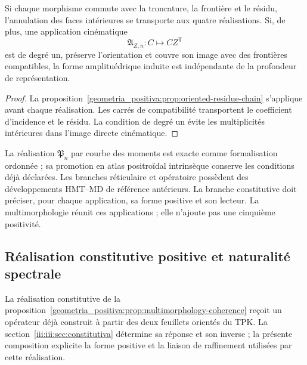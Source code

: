 \begin{proposition}
\label{geometria_positiva:prop:multimorphology-coherence} Si chaque morphisme commute avec la troncature, la frontière et le résidu, l’annulation des faces intérieures se transporte aux quatre réalisations. Si, de plus, une application cinématique
\[
\mathfrak A_{Z,n}:C\longmapsto CZ^{\mathsf T}
\]
est de degré un, préserve l’orientation et couvre son image avec des frontières compatibles, la forme amplituédrique induite est indépendante de la profondeur de représentation.
\end{proposition}
\begin{proof}
La proposition~\ref{geometria_positiva:prop:oriented-residue-chain} s’applique avant chaque réalisation. Les carrés de compatibilité transportent le coefficient d’incidence et le résidu. La condition de degré un évite les multiplicités intérieures dans l’image directe cinématique.
\end{proof}

La réalisation \(\mathfrak P_n\) par courbe des moments est exacte comme formalisation ordonnée ; sa promotion en atlas positroïdal intrinsèque conserve les conditions déjà déclarées. Les branches réticulaire et opératoire possèdent des développements HMT--MD de référence antérieurs. La branche constitutive doit préciser, pour chaque application, sa forme positive et son lecteur. La multimorphologie réunit ces applications ; elle n’ajoute pas une cinquième positivité.

\subsection{Réalisation constitutive positive et naturalité spectrale}
\label{empalme:positividad-constitutiva}

La réalisation constitutive de la proposition~\ref{geometria_positiva:prop:multimorphology-coherence} reçoit un opérateur déjà construit à partir des deux feuillets orientés du TPK. La section~\ref{iii:iii:sec:constitutiva} détermine sa réponse et son inverse ; la présente composition explicite la forme positive et la liaison de raffinement utilisées par cette réalisation.

